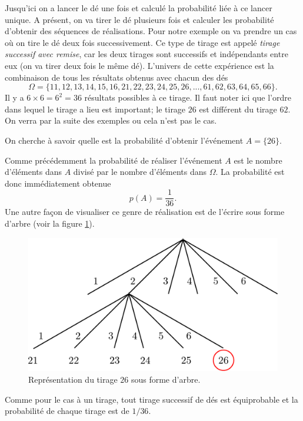 \documentclass[a4paper,12pt]{book}
\begin{document}
Jusqu'ici on a lancer le dé une fois et calculé la probabilité liée à ce lancer unique. 
A présent, on va tirer le dé plusieurs fois et calculer les probabilité d'obtenir des séquences 
de réalisations. Pour notre exemple on va prendre un cas où on tire le dé deux fois successivement.
Ce type de tirage est appelé \textit{tirage successif avec remise}, car les deux tirages sont 
successifs et indépendants entre eux (on va tirer deux fois le même dé). L'univers de 
cette expérience est la combinaison de tous les résultats obtenus avec chacun des dés
\begin{equation}
 \Omega=\{11,12,13,14,15,16,21,22,23,24,25,26,...,61,62,63,64,65,66\}.
\end{equation}
Il y a $6\times 6=6^2=36$ résultats possibles à ce tirage. Il faut noter ici que l'ordre dans lequel le tirage 
a lieu est important; le tirage $26$ est différent du tirage $62$. On verra par la suite des exemples ou cela n'est pas le cas.

On cherche à savoir quelle est la probabilité d'obtenir l'événement $A=\{26\}$.

Comme précédemment la probabilité de réaliser l'événement $A$ est le nombre d'éléments dans $A$ divisé par le nombre d'éléments dans $\Omega$.
La probabilité est donc immédiatement obtenue
\begin{equation}
 p(A)=\frac{1}{36}.
\end{equation}
Une autre façon de visualiser ce genre de réalisation est de l'écrire sous forme d'arbre
(voir la figure \ref{fig_arbre}).
\begin{figure}[htp]
\includegraphics[width=\textwidth]{figs/arbre.pdf}
\caption{Représentation du tirage $26$ sous forme d'arbre.}\label{fig_arbre}
\end{figure}
Comme pour le cas à un tirage, tout tirage successif de dés est équiprobable et la probabilité
de chaque tirage est de $1/36$.
\end{document}
